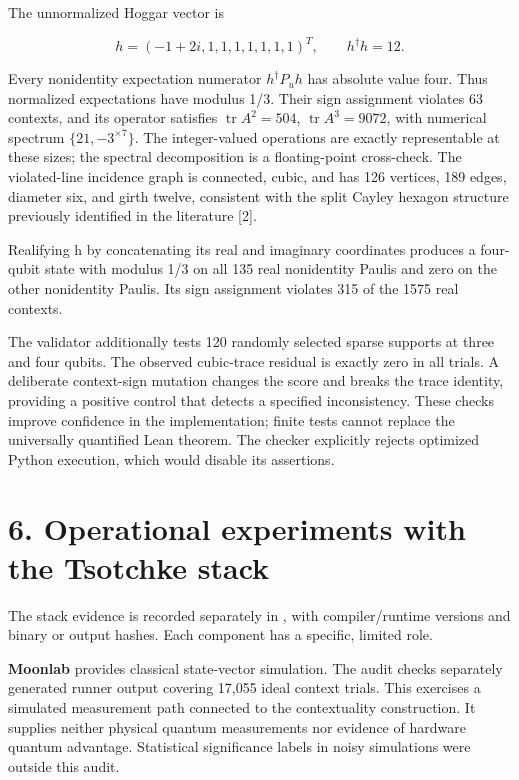 \documentclass[11pt,letterpaper]{article}
\begin{document}
The unnormalized Hoggar vector is

\[h=(-1+2i,1,1,1,1,1,1,1)^T,
\qquad h^\dagger h=12.\]

Every nonidentity expectation numerator \(h^\dagger P_uh\) has absolute value four. Thus normalized expectations have modulus 1/3. Their sign assignment violates 63 contexts, and its operator satisfies \(\operatorname{tr}A^2=504\), \(\operatorname{tr}A^3=9072\), with numerical spectrum \(\{21,-3^{\times7}\}\). The integer-valued operations are exactly representable at these sizes; the spectral decomposition is a floating-point cross-check. The violated-line incidence graph is connected, cubic, and has 126 vertices, 189 edges, diameter six, and girth twelve, consistent with the split Cayley hexagon structure previously identified in the literature {[}2{]}.

Realifying h by concatenating its real and imaginary coordinates produces a four-qubit state with modulus 1/3 on all 135 real nonidentity Paulis and zero on the other nonidentity Paulis. Its sign assignment violates 315 of the 1575 real contexts.

The validator additionally tests 120 randomly selected sparse supports at three and four qubits. The observed cubic-trace residual is exactly zero in all trials. A deliberate context-sign mutation changes the score and breaks the trace identity, providing a positive control that detects a specified inconsistency. These checks improve confidence in the implementation; finite tests cannot replace the universally quantified Lean theorem. The checker explicitly rejects optimized Python execution, which would disable its assertions.

\section{6. Operational experiments with the Tsotchke stack}\label{operational-experiments-with-the-tsotchke-stack}

The stack evidence is recorded separately in , with compiler/runtime versions and binary or output hashes. Each component has a specific, limited role.

\textbf{Moonlab} provides classical state-vector simulation. The audit checks separately generated runner output covering 17,055 ideal context trials. This exercises a simulated measurement path connected to the contextuality construction. It supplies neither physical quantum measurements nor evidence of hardware quantum advantage. Statistical significance labels in noisy simulations were outside this audit.
\end{document}
